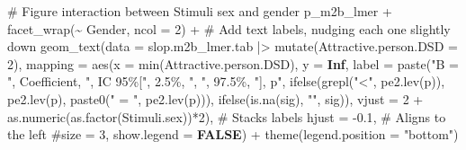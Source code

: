 \documentclass[
  bookmarksnumbered]{article}
\newenvironment{Shaded}{\begin{snugshade}}{\end{snugshade}}
\newcommand{\AttributeTok}[1]{\textcolor[rgb]{0.80,0.80,0.80}{#1}}
\newcommand{\CommentTok}[1]{\textcolor[rgb]{0.50,0.62,0.50}{#1}}
\newcommand{\ConstantTok}[1]{\textcolor[rgb]{0.86,0.64,0.64}{\textbf{#1}}}
\newcommand{\DecValTok}[1]{\textcolor[rgb]{0.86,0.86,0.80}{#1}}
\newcommand{\FloatTok}[1]{\textcolor[rgb]{0.75,0.75,0.82}{#1}}
\newcommand{\FunctionTok}[1]{\textcolor[rgb]{0.94,0.94,0.56}{#1}}
\newcommand{\NormalTok}[1]{\textcolor[rgb]{0.80,0.80,0.80}{#1}}
\newcommand{\SpecialCharTok}[1]{\textcolor[rgb]{0.86,0.64,0.64}{#1}}
\newcommand{\StringTok}[1]{\textcolor[rgb]{0.80,0.58,0.58}{#1}}
\begin{document}
\begin{Shaded}
\begin{Highlighting}[]
\CommentTok{\# Figure interaction between Stimuli sex and gender}
\NormalTok{p\_m2b\_lmer  }\SpecialCharTok{+}
  \FunctionTok{facet\_wrap}\NormalTok{(}\SpecialCharTok{\textasciitilde{}}\NormalTok{ Gender, }\AttributeTok{ncol =} \DecValTok{2}\NormalTok{) }\SpecialCharTok{+}
  \CommentTok{\# Add text labels, nudging each one slightly down}
  \FunctionTok{geom\_text}\NormalTok{(}\AttributeTok{data =}\NormalTok{ slop.m2b\_lmer.tab }\SpecialCharTok{|\textgreater{}} 
              \FunctionTok{mutate}\NormalTok{(}\AttributeTok{Attractive.person.DSD =} \DecValTok{2}\NormalTok{),}
            \AttributeTok{mapping =} \FunctionTok{aes}\NormalTok{(}\AttributeTok{x =} \FunctionTok{min}\NormalTok{(Attractive.person.DSD), }\AttributeTok{y =} \ConstantTok{Inf}\NormalTok{, }
                          \AttributeTok{label =} \FunctionTok{paste}\NormalTok{(}\StringTok{"B = "}\NormalTok{, Coefficient, }
                                        \StringTok{", IC 95\%["}\NormalTok{, }\StringTok{\textasciigrave{}}\AttributeTok{2.5\%}\StringTok{\textasciigrave{}}\NormalTok{, }\StringTok{", "}\NormalTok{, }\StringTok{\textasciigrave{}}\AttributeTok{97.5\%}\StringTok{\textasciigrave{}}\NormalTok{, }
                                        \StringTok{"], p"}\NormalTok{, }
                                        \FunctionTok{ifelse}\NormalTok{(}\FunctionTok{grepl}\NormalTok{(}\StringTok{"\textless{}"}\NormalTok{, }\FunctionTok{pe2.lev}\NormalTok{(p)), }\FunctionTok{pe2.lev}\NormalTok{(p), }
                                               \FunctionTok{paste0}\NormalTok{(}\StringTok{" = "}\NormalTok{, }\FunctionTok{pe2.lev}\NormalTok{(p))),}
                                        \FunctionTok{ifelse}\NormalTok{(}\FunctionTok{is.na}\NormalTok{(sig), }\StringTok{""}\NormalTok{, sig)),}
                          \AttributeTok{vjust =} \DecValTok{2} \SpecialCharTok{+} \FunctionTok{as.numeric}\NormalTok{(}\FunctionTok{as.factor}\NormalTok{(Stimuli.sex))}\SpecialCharTok{*}\DecValTok{2}\NormalTok{),  }\CommentTok{\# Stacks labels}
            \AttributeTok{hjust =} \SpecialCharTok{{-}}\FloatTok{0.1}\NormalTok{,  }\CommentTok{\# Aligns to the left}
            \CommentTok{\#size = 3,}
            \AttributeTok{show.legend =} \ConstantTok{FALSE}\NormalTok{) }\SpecialCharTok{+}
  \FunctionTok{theme}\NormalTok{(}\AttributeTok{legend.position =} \StringTok{"bottom"}\NormalTok{)}
\end{Highlighting}
\end{Shaded}
\end{document}
